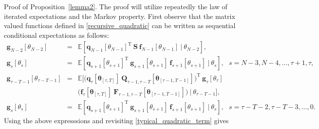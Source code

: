 \documentclass[letterpaper,11pt]{article}
\newcommand{\T}{\mathrm{T}}
\begin{document}
Proof of Proposition~\ref{lemma2}.	
The proof will utilize repeatedly the law of iterated expectations and the Markov property. 
First observe that the matrix valued functions defined in \eqref{recursive_quadratic}
can be written as sequential conditional expectations as follows:
\begin{eqnarray*}
	\nonumber
	\mathbf{g}_{N-2}[\theta_{N-2}] & = & \mathbb{E}[\mathbf{q}_{N-1}[\theta_{N-1}]^\T~ \mathbf{S} ~ \mathbf{f}_{N-1}[\theta_{N-1}] ~|~\theta_{N-2}],  \\
	\nonumber
	\mathbf{g}_{s}[\theta_{s}] & = &   \mathbb{E}[\mathbf{q}_{s+1}[\theta_{s+1}]^\T ~ \mathbf{g}_{s+1}[\theta_{s+1}]~ \mathbf{f}_{s+1}[\theta_{s+1}] ~|~\theta_s], ~~~
	s = N-3, N-4, \hdots, \tau+1, \tau,  \\
	\mathbf{g}_{\tau-T-1}[\theta_{\tau-T-1}] & = &
	\mathbb{E}[\bigg( \mathbf{q}_{\tau}[\bm{\theta}_{[\tau,T]}] ~ 
	\mathbf{Q}_{\tau-1, \tau-T}[\bm{\theta}_{[\tau-1,T-1]}] \bigg)^\T ~ \mathbf{g}_{\tau}[\theta_{\tau}] \\
	&& 
	\bigg( \mathbf{f}_{\tau}[\bm{\theta}_{[\tau,T]}] ~ 
	\mathbf{F}_{\tau-1, \tau-T}[\bm{\theta}_{[\tau-1,T-1]}] \bigg)~|~\theta_{\tau-T-1}], \\
	\mathbf{g}_{s}[\theta_{s}] & = & \mathbb{E}[\mathbf{q}_{s+1}[\theta_{s+1}]^\T ~ \mathbf{g}_{s+1}[\theta_{s+1}]~ \mathbf{f}_{s+1}[\theta_{s+1}] ~|~\theta_s], ~~~
	s = \tau - T -2 ,  \tau - T - 3, \hdots, 0.  
\end{eqnarray*}
Using the above expresssions and revisiting \eqref{typical_quadratic_term} gives
\end{document}

